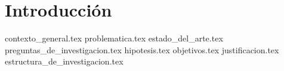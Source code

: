 \section{Introducción}

{contexto_general.tex}
{problematica.tex}
{estado_del_arte.tex}
{preguntas_de_investigacion.tex}
{hipotesis.tex}
{objetivos.tex}
{justificacion.tex}
{estructura_de_investigacion.tex}

